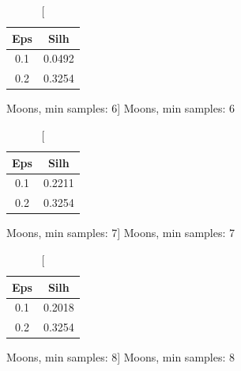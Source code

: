 \documentclass{classrep}
\begin{document}
{{{                \begin{table}[!htbp]
                    \begin{minipage}{.24\textwidth}
                        \centering
                        \begin{tabular}{|c|c|}
                            \hline
                            Eps & Silh \\ \hline
                            0.1 & 0.0492 \\ \hline
                            0.2 & 0.3254 \\ \hline
                        \end{tabular}
                        \caption
                        [Moons, min samples: 6]
                        {Moons, min samples: 6}
                        \label{db_scan_table_Moons_eucl_min_sample6}
                    \end{minipage}
                    \hfill
                    \begin{minipage}{.24\textwidth}
                        \centering
                        \begin{tabular}{|c|c|}
                            \hline
                            Eps & Silh \\ \hline
                            0.1 & 0.2211 \\ \hline
                            0.2 & 0.3254 \\ \hline
                        \end{tabular}
                        \caption
                        [Moons, min samples: 7]
                        {Moons, min samples: 7}
                        \label{db_scan_table_Moons_eucl_min_sample7}
                    \end{minipage}
                    \hfill
                    \begin{minipage}{.24\textwidth}
                        \centering
                        \begin{tabular}{|c|c|}
                            \hline
                            Eps & Silh \\ \hline
                            0.1 & 0.2018 \\ \hline
                            0.2 & 0.3254 \\ \hline
                        \end{tabular}
                        \caption
                        [Moons, min samples: 8]
                        {Moons, min samples: 8}

\end{minipage}
\end{table}}}}
\end{document}
